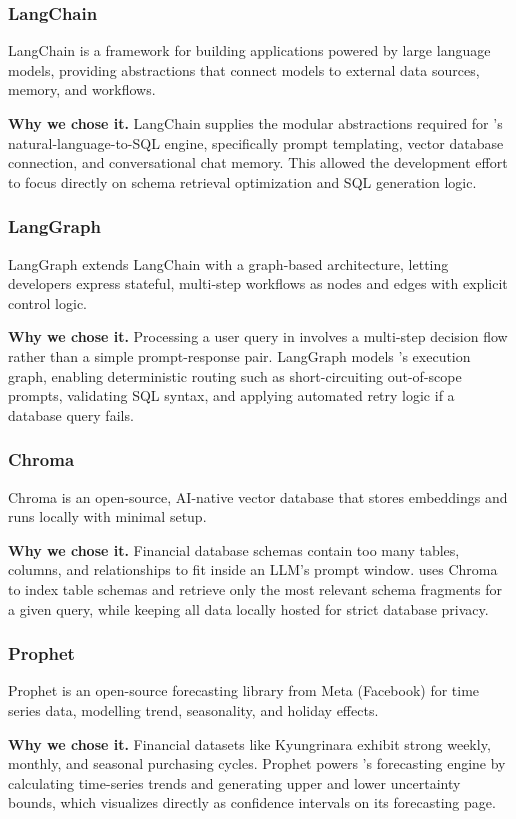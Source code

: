 \subsubsection{LangChain}
LangChain is a framework for building applications powered by large
language models, providing abstractions that connect models to external
data sources, memory, and workflows.

\noindent \textbf{Why we chose it.} LangChain supplies the modular abstractions required for
\projname{}'s natural-language-to-SQL engine, specifically prompt templating,
vector database connection, and conversational chat memory. This allowed
the development effort to focus directly on schema retrieval optimization and
SQL generation logic.

\subsubsection{LangGraph}
LangGraph extends LangChain with a graph-based architecture, letting
developers express stateful, multi-step workflows as nodes and edges
with explicit control logic.

\noindent \textbf{Why we chose it.} Processing a user query in \projname{} involves a multi-step
decision flow rather than a simple prompt-response pair. LangGraph models
\projname{}'s execution graph, enabling deterministic routing such as short-circuiting
out-of-scope prompts, validating SQL syntax, and applying automated retry logic
if a database query fails.

\subsubsection{Chroma}
Chroma is an open-source, AI-native vector database that stores
embeddings and runs locally with minimal setup.

\noindent \textbf{Why we chose it.} Financial database schemas contain too many tables,
columns, and relationships to fit inside an LLM's prompt window. \projname{} uses
Chroma to index table schemas and retrieve only the most relevant schema fragments
for a given query, while keeping all data locally hosted for strict database privacy.

\subsubsection{Prophet}
Prophet is an open-source forecasting library from Meta (Facebook) for
time series data, modelling trend, seasonality, and holiday effects.

\noindent \textbf{Why we chose it.} Financial datasets like Kyungrinara exhibit strong
weekly, monthly, and seasonal purchasing cycles. Prophet powers \projname{}'s
forecasting engine by calculating time-series trends and generating upper and
lower uncertainty bounds, which \projname{} visualizes directly as confidence intervals
on its forecasting page.
